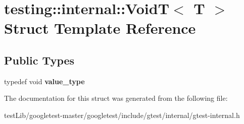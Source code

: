 \hypertarget{structtesting_1_1internal_1_1VoidT}{}\section{testing\+:\+:internal\+:\+:VoidT$<$ T $>$ Struct Template Reference}
\label{structtesting_1_1internal_1_1VoidT}
\subsection*{Public Types}
\begin{DoxyCompactItemize}
\item 
\mbox{\label{structtesting_1_1internal_1_1VoidT_a29e6a3f3989ddb47103944b350f1bec0}} 
typedef void {\bfseries value\+\_\+type}
\end{DoxyCompactItemize}


The documentation for this struct was generated from the following file\+:\begin{DoxyCompactItemize}
\item 
test\+Lib/googletest-\/master/googletest/include/gtest/internal/gtest-\/internal.\+h\end{DoxyCompactItemize}
